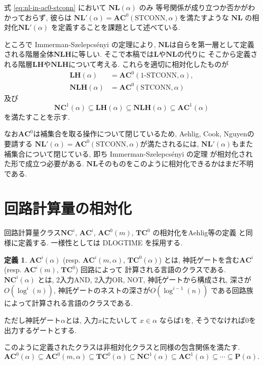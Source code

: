\documentclass[11pt,a4paper]{jsarticle}
\theoremstyle{definition}
\newtheorem{definition}[theorem]{定義}
\theoremstyle{remark}
\newcommand{\classfont}{\mathbf}
\newcommand{\AC}{\classfont{AC}}
\newcommand{\TC}{\classfont{TC}}
\newcommand{\NC}{\classfont{NC}}
\renewcommand{\L}{\classfont{L}}
\newcommand{\NL}{\classfont{NL}}
\renewcommand{\P}{\classfont{P}}
\newcommand{\LH}{\classfont{LH}}
\newcommand{\NLH}{\classfont{NLH}}
\newcommand{\probfont}{\text}
\newcommand{\oneSTCONN}{\probfont{1-STCONN}}
\newcommand{\STCONN}{\probfont{STCONN}}
\begin{document}
式 \eqref{eq:nl-in-ac0-stconn} において $\NL(\alpha)$ のみ
等号関係が成り立つか否かがわかっておらず, 
彼らは $\NL'(\alpha) = \AC^0(\STCONN, \alpha)$を満たすような
$\NL$ の相対化$\NL'(\alpha)$ を定義することを課題として述べている.

ところで Immerman-Szelepcs{\'e}nyi の定理\cite{immerman1988nondeterministic,szelepcsenyi1988method}により, 
$\NL$は自らを第一層として定義される階層全体$\NLH$に等しい. 
そこで本稿では$\L$や$\NL$の代りに
そこから定義される階層$\LH$や$\NLH$について考える. 
これらを適切に相対化したものが
\begin{align*}
 \LH(\alpha) &= \AC^0 (\oneSTCONN, \alpha),
 \\
 \NLH(\alpha) &= \AC^0(\STCONN, \alpha)
\end{align*}
及び
\begin{equation*}
 \NC^1(\alpha) \subseteq \LH(\alpha) \subseteq \NLH(\alpha) \subseteq \AC^1(\alpha)
\end{equation*}
を満たすことを示す.

なお$\AC^0$は補集合を取る操作について閉じているため,
Aehlig, Cook, Nguyenの要請する
$\NL'(\alpha) = \AC^0(\STCONN, \alpha)$が満たされるには, 
$\NL' (\alpha)$もまた補集合について閉じている, 
即ち Immerman-Szelepcs{\'e}nyi の定理 
\cite{immerman1988nondeterministic,szelepcsenyi1988method}
が相対化された形で成立つ必要がある. 
$\NL$そのものをこのように相対化できるかはまだ不明である. 

\section{回路計算量の相対化}

回路計算量クラス$\NC^i$, $\AC^i$, $\AC^0(m)$, $\TC^0$ の相対化をAehlig等の定義
\cite{aehlig2007relativizing} と同様に定義する.
一様性としては DLOGTIME を採用する.
\begin{definition}
$\AC^i(\alpha)$ (resp. $\AC^i(m, \alpha)$, $\TC^0(\alpha)$) とは,
神託ゲートを含む$\AC^i$ (resp. $\AC^i(m)$, $\TC^0$) 回路によって
計算される言語のクラスである.
$\NC^i(\alpha)$ とは, 2入力AND, 2入力OR, NOT, 神託ゲートから構成され,
深さが$O(\log^i(n))$, 神託ゲートのネストの深さが$O(\log^{i-1}(n))$
である回路族によって計算される言語のクラスである.
\end{definition}
ただし神託ゲート$\alpha$とは, 入力$x$にたいして $x \in \alpha$ ならば$1$を, 
そうでなければ$0$を出力するゲートとする.

このように定義されたクラスは非相対化クラスと同様の包含関係を満たす.
\begin{equation*}
 \AC^0(\alpha) \subseteq \AC^0(m, \alpha) \subseteq \TC^0(\alpha) 
 \subseteq \NC^1(\alpha) \subseteq \AC^1(\alpha) \subseteq \cdots \subseteq \P(\alpha).
\end{equation*}
\end{document}
